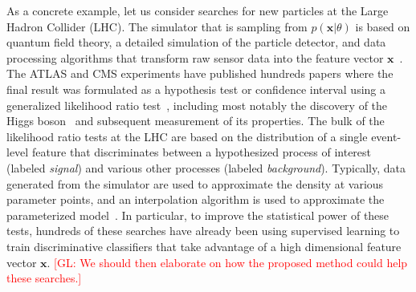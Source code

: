 \documentclass[12pt]{article}
\numberwithin{equation}{section}
\theoremstyle{plain}
\newcommand{\glnote}[1]{\textcolor{red}{[GL: #1]}}
\begin{document}
As a concrete example, let us consider searches for new particles at the Large
Hadron Collider (LHC). The simulator that is sampling from $p(\mathbf{x}|\theta)$ is
based on quantum field theory, a detailed simulation of the particle detector,
and data processing algorithms that transform raw sensor data into the feature
vector $\mathbf{x}$~\citep{Sjostrand:2006za,Agostinelli:2002hh}. The ATLAS and CMS
experiments have published  hundreds papers where the final result was
formulated as a hypothesis test or confidence interval using a generalized
likelihood ratio test~\citep{Cowan:2010js}, including most notably the discovery
of the Higgs boson~\citep{Aad:2012tfa,Chatrchyan:2012ufa} and subsequent
measurement of its properties. The bulk of the likelihood ratio tests at the LHC
are based on the distribution of a single event-level feature that discriminates
between a hypothesized process of interest (labeled \textit{signal}) and various
other processes (labeled \textit{background}). Typically, data generated from the
simulator are used to approximate the density at various parameter points, and
an interpolation algorithm is used to approximate the parameterized
model~\citep{Cranmer:2012sba}. In particular, to improve the statistical power
of these tests, hundreds of these searches have already been using supervised
learning to train discriminative classifiers that take advantage of a high
dimensional feature vector $\mathbf{x}$. \glnote{We should then elaborate on how the
proposed method could help these searches.}
\end{document}
